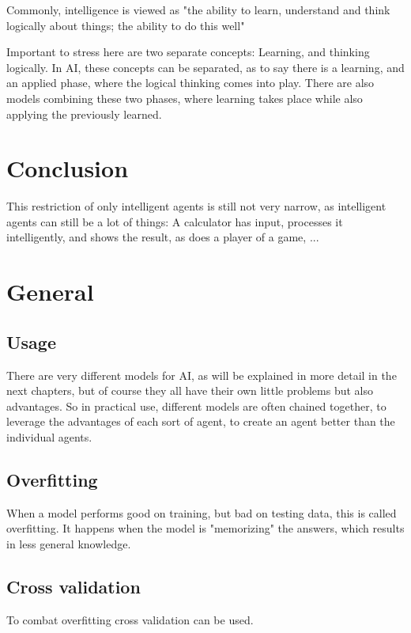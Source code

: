 Commonly, intelligence is viewed as "the ability to learn, understand and think logically about things; the ability to do this well" 

Important to stress here are two separate concepts: Learning, and thinking logically.
In AI, these concepts can be separated, as to say there is a learning, and an applied phase, where the logical thinking comes into play. %
There are also models combining these two phases, where learning takes place while also applying the previously learned. %

\section{Conclusion}
This restriction of only intelligent agents is still not very narrow, as intelligent agents can still be a lot of things: A calculator has input, processes it intelligently, and shows the result, as does a player of a game, ...

\section{General}
\subsection{Usage}
There are very different models for AI, as will be explained in more detail in the next chapters, but of course they all have their own little problems but also advantages. So in practical use, different models are often chained together, to leverage the advantages of each sort of agent, to create an agent better than the individual agents. %
\subsection{Overfitting}
When a model performs good on training, but bad on testing data, this is called overfitting. It happens when the model is "memorizing" the answers, which results in less general knowledge.
\subsection{Cross validation}
To combat overfitting cross validation can be used.